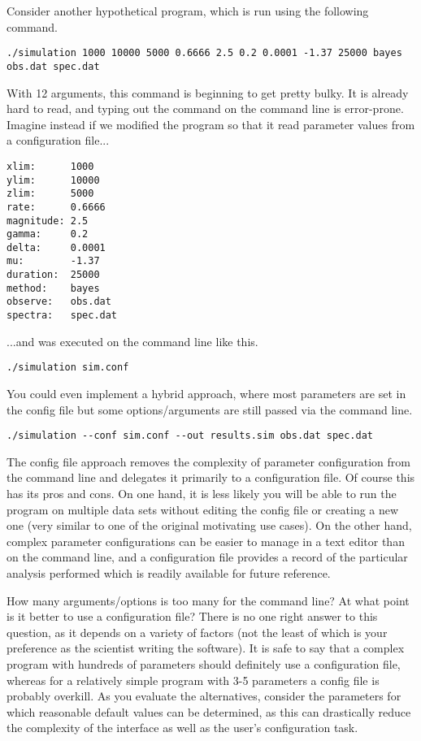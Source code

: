 \documentclass{article}
\begin{document}
Consider another hypothetical program, which is run using the following command.
\begin{verbatim}
./simulation 1000 10000 5000 0.6666 2.5 0.2 0.0001 -1.37 25000 bayes obs.dat spec.dat
\end{verbatim}
With 12 arguments, this command is beginning to get pretty bulky.
It is already hard to read, and typing out the command on the command line is error-prone.
Imagine instead if we modified the program so that it read parameter values from a configuration file...
\begin{verbatim}
xlim:      1000
ylim:      10000
zlim:      5000
rate:      0.6666
magnitude: 2.5
gamma:     0.2
delta:     0.0001
mu:        -1.37
duration:  25000
method:    bayes
observe:   obs.dat
spectra:   spec.dat
\end{verbatim}
...and was executed on the command line like this.
\begin{verbatim}
./simulation sim.conf
\end{verbatim}
You could even implement a hybrid approach, where most parameters are set in the config file but some options/arguments are still passed via the command line.
\begin{verbatim}
./simulation --conf sim.conf --out results.sim obs.dat spec.dat
\end{verbatim}

The config file approach removes the complexity of parameter configuration from the command line and delegates it primarily to a configuration file. Of course this has its pros and cons. On one hand, it is less likely you will be able to run the program on multiple data sets without editing the config file or creating a new one (very similar to one of the original motivating use cases). On the other hand, complex parameter configurations can be easier to manage in a text editor than on the command line, and a configuration file provides a record of the particular analysis performed which is readily available for future reference.

How many arguments/options is too many for the command line? At what point is it better to use a configuration file? There is no one right answer to this question, as it depends on a variety of factors (not the least of which is your preference as the scientist writing the software). It is safe to say that a complex program with hundreds of parameters should definitely use a configuration file, whereas for a relatively simple program with 3-5 parameters a config file is probably overkill. As you evaluate the alternatives, consider the parameters for which reasonable default values can be determined, as this can drastically reduce the complexity of the interface as well as the user's configuration task.
\end{document}
